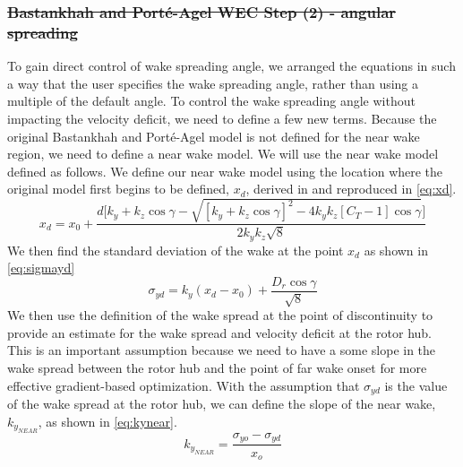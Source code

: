 \documentclass[a4paper]{jpconf}
\providecommand{\DIFdel}[1]{{\protect\color{red}\sout{#1}}}                      %
\providecommand{\DIFdelend}{} %
\DeclareRobustCommand{\DIFdelend}{\DIFOaddend \let\includegraphics\DIFOincludegraphics} %
\begin{document}
\subsubsection{\DIFdel{Bastankhah and Port\'e-Agel WEC Step (2) - angular spreading}}
\addtocounter{subsubsection}{-1}%
\DIFdelend To gain direct control of wake spreading angle, we arranged the equations in such a way that the user specifies the wake spreading angle, rather than using a multiple of the default angle. To control the wake spreading angle without impacting the velocity deficit, we need to define a few new terms.
%
Because the original Bastankhah and Port\'{e}-Agel model is not defined for the near wake region, we need to define a near wake model. We will use the near wake model defined as follows. We define our near wake model using the location where the original model first begins to be defined, $x_d$, derived in \cite{thomas2019-les-validation} and reproduced in \cref{eq:xd}.
%
\begin{equation}\label{eq:xd}
x_d = x_0 + \frac{d\Bigg[k_y+k_z\cos{\gamma} - \sqrt{[k_y+k_z\cos{\gamma}]^2-4k_y k_z[C_T-1]\cos{\gamma}}\Bigg]}{2k_y k_z\sqrt{8}}
\end{equation}
%
We then find the standard deviation of the wake at the point $x_d$ as shown in \cref{eq:sigmayd}
%
\begin{equation}\label{eq:sigmayd}
\sigma_{yd} = k_y (x_d - x_0) + \frac{D_r \cos{\gamma}}{\sqrt{8}}
\end{equation}
%
We then use the definition of the wake spread at the point of discontinuity to provide an estimate for the wake spread and velocity deficit at the rotor hub. This is an important assumption because we need to have a some slope in the wake spread between the rotor hub and the point of far wake onset for more effective gradient-based optimization. With the assumption that $\sigma_{yd}$ is the value of the wake spread at the rotor hub, we can define the slope of the near wake, $k_{y_{NEAR}}$, as shown in \cref{eq:kynear}.
%
\begin{equation}\label{eq:kynear}
k_{y_{NEAR}} = \frac{\sigma_{yo}-\sigma_{yd}}{x_o}
\end{equation}
\end{document}
